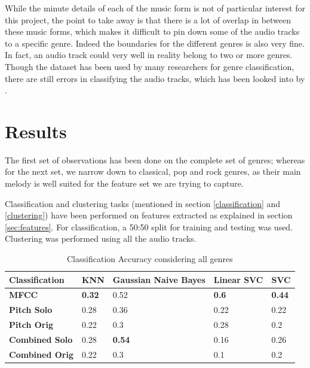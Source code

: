 \documentclass[12pt,journal,compsoc]{IEEEtran}
\begin{document}
While the minute details of each of the music form is not of particular interest for this project, the point to take away is that there is a lot of overlap in between these music forms, which makes it difficult to pin down some of the audio tracks to a specific genre. Indeed the boundaries for the different genres is also very fine. In fact, an audio track could very well in reality belong to two or more genres. Though the dataset has been used by many researchers for genre classification, there are still errors in classifying the audio tracks, which has been looked into by \cite{sturm}.

\section{Results}

The first set of observations has been done on the complete set of genres; whereas for the next set, we narrow down to classical, pop and rock genres, as their main melody is well suited for the feature set we are trying to capture.

Classification and clustering tasks (mentioned in section \ref{classification} and \ref{clustering}) have been performed on features extracted as explained in section \ref{sec:features}. For classification, a 50:50 split for training and testing was used. Clustering was performed using all the  audio tracks.

\begin{table}[H]
	\centering
    \begin{tabular}{| p{1.85cm} | l | p{1.8cm} | p{1.5cm} | l |}
    \hline
    \textbf{Classification} & \textbf{KNN} & \textbf{Gaussian Naive Bayes} & \textbf{Linear SVC} & \textbf{SVC} \\ \hline
    \textbf{MFCC} & \textbf{0.32} & 0.52 & \textbf{0.6} & \textbf{0.44} \\ \hline
    \textbf{Pitch Solo} & 0.28 & 0.36 & 0.22 & 0.22 \\ \hline
    \textbf{Pitch Orig} & 0.22 & 0.3 & 0.28 & 0.2 \\ \hline
    \textbf{Combined Solo} & 0.28 & \textbf{0.54} & 0.16 & 0.26 \\ \hline
    \textbf{Combined Orig} & 0.22 & 0.3 & 0.1 & 0.2 \\
    \hline
    \end{tabular}
    \caption{Classification Accuracy considering all genres}
    \label{table:classAll}
\end{table}
\end{document}
